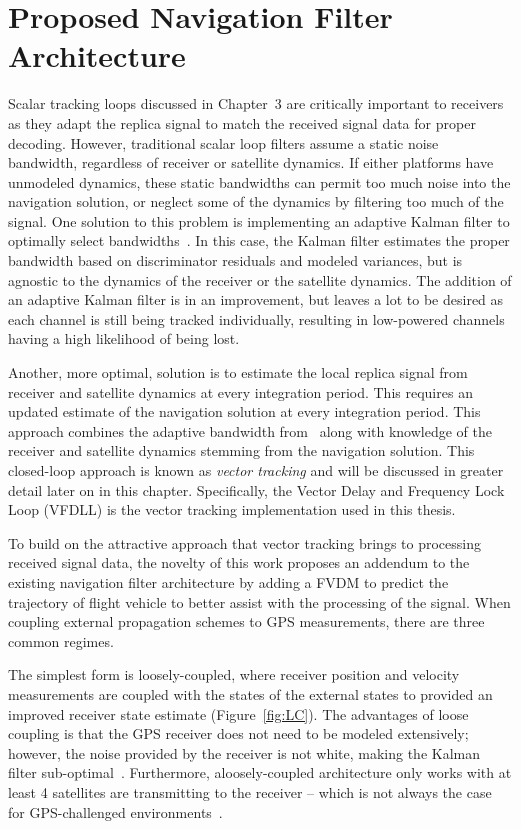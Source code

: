 \chapter{Proposed Navigation Filter Architecture}
Scalar tracking loops discussed in Chapter~3 are critically important to receivers as they adapt the replica signal to match the received signal data for proper decoding. However, traditional scalar loop filters assume a static noise bandwidth, regardless of receiver or satellite dynamics. If either platforms have unmodeled dynamics, these static bandwidths can permit too much noise into the navigation solution, or neglect some of the dynamics by filtering too much of the signal. One solution to this problem is implementing an adaptive Kalman filter to optimally select bandwidths~\cite{huangIntegratedAdaptiveKalman2019}. In this case, the Kalman filter estimates the proper bandwidth based on discriminator residuals and modeled variances, but is agnostic to the dynamics of the receiver or the satellite dynamics. The addition of an adaptive Kalman filter is in an improvement, but leaves a lot to be desired as each channel is still being tracked individually, resulting in low-powered channels having a high likelihood of being lost.

Another, more optimal, solution is to estimate the local replica signal from receiver and satellite dynamics at every integration period. This requires an updated estimate of the navigation solution at every integration period. This approach combines the adaptive bandwidth from~\cite{huangIntegratedAdaptiveKalman2019} along with knowledge of the receiver and satellite dynamics stemming from the navigation solution. This closed-loop approach is known as \textit{vector tracking} and will be discussed in greater detail later on in this chapter. Specifically, the Vector Delay and Frequency Lock Loop (VFDLL) is the vector tracking implementation used in this thesis.

To build on the attractive approach that vector tracking brings to processing received signal data, the novelty of this work proposes an addendum to the existing navigation filter architecture by adding a FVDM to predict the trajectory of flight vehicle to better assist with the processing of the signal. When coupling external propagation schemes to GPS measurements, there are three common regimes.

The simplest form is loosely-coupled, where receiver position and velocity measurements are coupled with the states of the external states to provided an improved receiver state estimate (Figure~\ref{fig:LC}). The advantages of loose coupling is that the GPS receiver does not need to be modeled extensively; however, the noise provided by the receiver is not white, making the Kalman filter sub-optimal~\cite{lashleyPerformanceAnalysisVector2009}. Furthermore, a{loosely-coupled} architecture only works with at least 4 satellites are transmitting to the receiver {--} which is not always the case for GPS-challenged environments~\cite{grovesPrinciplesGNSSInertial2012}.

